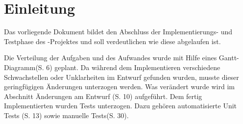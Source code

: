 \chapter{Einleitung}
Das vorliegende Dokument bildet den Abschluss der Implementierungs- und Testphase des \projektTitel-Projektes und soll verdeutlichen wie diese abgelaufen ist.

Die Verteilung der Aufgaben und des Aufwandes wurde mit Hilfe eines Gantt-Diagramm(S. 6) geplant.
Da während dem Implementieren verschiedene Schwachstellen oder Unklarheiten im Entwurf gefunden wurden, musste dieser geringfügigen Änderungen unterzogen werden.
Was verändert wurde wird im Abschnitt Änderungen am Entwurf (S. 10) aufgeführt.
Dem fertig Implementierten \projektTitel wurden Tests unterzogen. Dazu gehören automatisierte Unit Tests (S. 13) sowie manuelle Tests(S. 30).